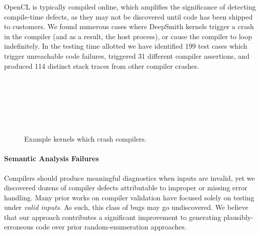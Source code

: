 OpenCL is typically compiled online, which amplifies the significance of detecting compile-time defects, as they may not be discovered until code has been shipped to customers. We found numerous cases where DeepSmith kernels trigger a crash in the compiler (and as a result, the host process), or cause the compiler to loop indefinitely. In the testing time allotted we have identified 199 test cases which trigger unreachable code failures, triggered 31 different compiler assertions, and produced 114 distinct stack traces from other compiler crashes.

\begin{figure}
  \centering %
  \\%
  \\%
  \\%
  \\%
  \\%
  \caption{Example kernels which crash compilers.}%
\end{figure}
 
\paragraph{Semantic Analysis Failures} %
Compilers should produce meaningful diagnostics when inputs are invalid, yet we discovered dozens of compiler defects attributable to improper or missing error handling. Many prior works on compiler validation have focused solely on testing under \emph{valid inputs}. As such, this class of bugs may go undiscovered. We believe that our approach contributes a significant improvement to generating plausibly-erroneous code over prior random-enumeration approaches.

